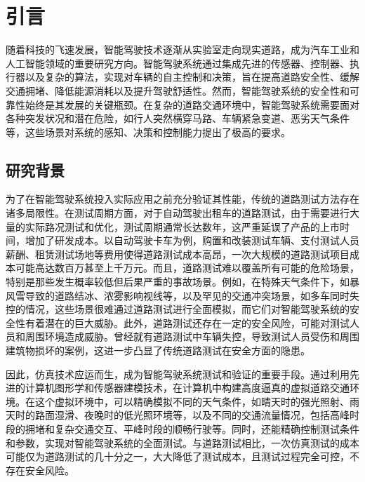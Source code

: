 \chapter{引言}

随着科技的飞速发展，智能驾驶技术逐渐从实验室走向现实道路，成为汽车工业和人工智能领域的重要研究方向。智能驾驶系统通过集成先进的传感器、控制器、执行器以及复杂的算法，实现对车辆的自主控制和决策，旨在提高道路安全性、缓解交通拥堵、降低能源消耗以及提升驾驶舒适性。然而，智能驾驶系统的安全性和可靠性始终是其发展的关键瓶颈。在复杂的道路交通环境中，智能驾驶系统需要面对各种突发状况和潜在危险，如行人突然横穿马路、车辆紧急变道、恶劣天气条件等，这些场景对系统的感知、决策和控制能力提出了极高的要求。

\section{研究背景}


为了在智能驾驶系统投入实际应用之前充分验证其性能，传统的道路测试方法存在诸多局限性。在测试周期方面，对于自动驾驶出租车的道路测试，由于需要进行大量的实际路况测试和优化，测试周期通常长达数年，这严重延误了产品的上市时间，增加了研发成本。以自动驾驶卡车为例，购置和改装测试车辆、支付测试人员薪酬、租赁测试场地等费用使得道路测试成本高昂，一次大规模的道路测试项目成本可能高达数百万甚至上千万元。而且，道路测试难以覆盖所有可能的危险场景，特别是那些发生概率较低但后果严重的事故场景。例如，在特殊天气条件下，如暴风雪导致的道路结冰、浓雾影响视线等，以及罕见的交通冲突场景，如多车同时失控的情况，这些场景很难通过道路测试进行全面模拟，而它们对智能驾驶系统的安全性有着潜在的巨大威胁。此外，道路测试还存在一定的安全风险，可能对测试人员和周围环境造成威胁。曾经就有道路测试中车辆失控，导致测试人员受伤和周围建筑物损坏的案例，这进一步凸显了传统道路测试在安全方面的隐患。

因此，仿真技术应运而生，成为智能驾驶系统测试和验证的重要手段。通过利用先进的计算机图形学和传感器建模技术，在计算机中构建高度逼真的虚拟道路交通环境。在这个虚拟环境中，可以精确模拟不同的天气条件，如晴天时的强光照射、雨天时的路面湿滑、夜晚时的低光照环境等，以及不同的交通流量情况，包括高峰时段的拥堵和复杂交通交互、平峰时段的顺畅行驶等。同时，还能精确控制测试条件和参数，实现对智能驾驶系统的全面测试。与道路测试相比，一次仿真测试的成本可能仅为道路测试的几十分之一，大大降低了测试成本，且测试过程完全可控，不存在安全风险。

